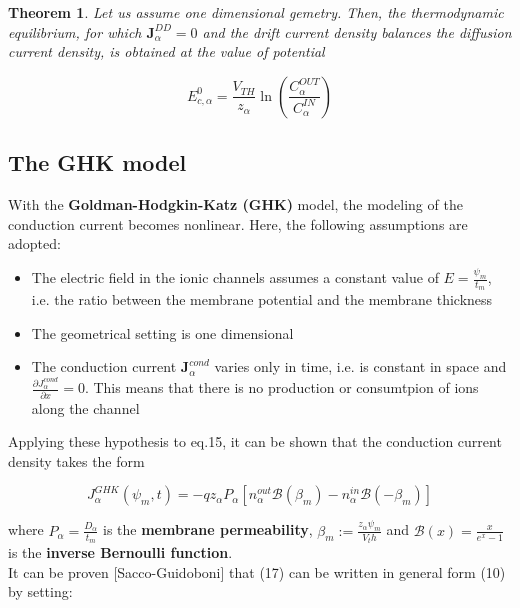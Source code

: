 \documentclass[a4paper]{article}
\newtheorem{theorem}{Theorem}[section]
\begin{document}
\begin{theorem}
	Let us assume one dimensional gemetry. Then, the thermodynamic equilibrium, for which $\textbf{J}_{\alpha}^{DD} = 0$ and  the drift current density balances the diffusion current density, is obtained at the value of potential

\begin{equation}
	E_{c,\alpha}^0 = \frac{V_{TH}}{z_{\alpha}}\ln\left(\frac{C_{\alpha}^{OUT}}{C_{\alpha}^{IN}}\right)
\end{equation}	


\end{theorem}




\subsection{The GHK model}
With the \textbf{Goldman-Hodgkin-Katz (GHK)} model, the modeling of the conduction current becomes nonlinear. Here, the following assumptions are adopted: 

\begin{itemize}
	
	\item The electric field in the ionic channels assumes a constant value of $ E = \frac{\psi_m}{t_m}$, i.e. the ratio between the membrane potential and the membrane thickness
	
	\item The geometrical setting is one dimensional
	
	\item The conduction current $\textbf{J}_{\alpha}^{cond}$ varies only in time, i.e. is constant in space and $ \frac{\partial J_{\alpha}^{cond} }{\partial x} = 0$. This means that there is no production or consumtpion of ions along the channel
	
\end{itemize}

Applying these hypothesis to eq.15, it can be shown that the conduction current density takes the form

\begin{equation}
	J_{\alpha}^{GHK}(\psi_m,t) = -qz_{\alpha}P_{\alpha}\left[n_{\alpha}^{out} \mathcal{B}(\beta_m) - n_{\alpha}^{in} \mathcal{B}(-\beta_m) \right]
\end{equation}

where $P_{\alpha} = \frac{D_{\alpha}}{t_m}$ is the \textbf{membrane permeability}, $ \beta_m := \frac{z_{\alpha} \psi_m}{V_th}$ and $ \mathcal{B}(x) = \frac{x}{e^x -1}$ is the \textbf{inverse Bernoulli function}.\\
It can be proven [Sacco-Guidoboni] that (17) can be written in general form (10) by setting:
\end{document}
